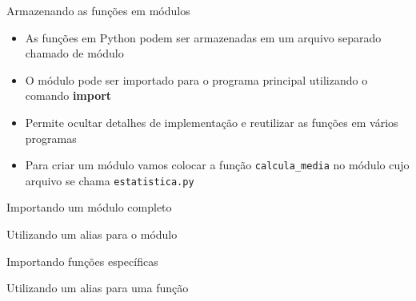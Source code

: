 \begin{frame}{Armazenando as funções em módulos}
  \begin{itemize}
    \item As funções em Python podem ser armazenadas em um arquivo separado chamado de módulo
    \item O módulo pode ser importado para o programa principal utilizando o comando {\bf import}
    \item Permite ocultar detalhes de implementação e reutilizar as funções em vários programas
    \item Para criar um módulo vamos colocar a função \verb!calcula_media! no módulo cujo arquivo se chama \verb!estatistica.py!
  
  \end{itemize}
\end{frame}
%
\begin{frame}[t, fragile]{Importando um módulo completo}
  
\end{frame}
%
%
\begin{frame}[t, fragile]{Utilizando um alias para o módulo}
  
\end{frame}
%
\begin{frame}[t, fragile]{Importando funções específicas}
  
\end{frame}
%
\begin{frame}[t, fragile]{Utilizando um alias para uma função}
  
\end{frame}
%


 